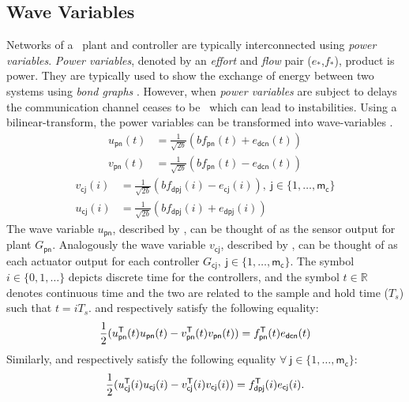 \subsection{Wave Variables}
\label{S:wave_variables}
 Networks of a \passive\ plant and controller are typically
  interconnected using {\it power variables}.  {\it Power variables}, 
  denoted by an {\it effort} and {\it flow} pair ($e_*$,$f_*$),
  product is power.  They are typically used to show the 
  exchange of energy between two systems using {\it bond graphs}
  \cite{breedveld06:_port_based_model_dynam_system, golo03:_hamil}.
  However, when {\it power variables} are subject to delays the
  communication channel ceases to be \passive\ which can lead to
  instabilities.  Using a bilinear-transform, the power variables can
  be transformed into wave-variables
  \cite{anderson92:_asymp_stabil_for_force_reflec,
    niemeyer04:_telem}.
\begin{align}
  \label{E:wave_transform_master_u}
  u_{\mathsf{pn}}(t) &= \frac{1}{\sqrt{2b}}(b f_{\mathsf{pn}}(t) + e_{\mathsf{dcn}}(t))\\
  \label{E:wave_transform_master_v}
  v_{\mathsf{pn}}(t) &= \frac{1}{\sqrt{2b}}(b f_{\mathsf{pn}}(t) - e_{\mathsf{dcn}}(t)) 
\end{align}
\begin{align}
  \label{E:wave_transform_slave_v}
  v_{\mathsf{cj}}(i) &= \frac{1}{\sqrt{2b}}(b f_{\mathsf{dpj}}(i) - e_{\mathsf{cj}}(i)),\ \mathsf{j} \in
  \{1, \dots, \mathsf{m_c}\}\\
  \label{E:wave_transform_slave_u}
  u_{\mathsf{cj}}(i) &= \frac{1}{\sqrt{2b}}(b f_{\mathsf{dpj}}(i) + e_{\mathsf{dpj}}(i))
\end{align}
  The wave variable $u_{\mathsf{pn}}$, described by , can
  be thought of as the sensor output for plant $G_{\mathsf{pn}}$.
  Analogously the wave variable $v_{\mathsf{cj}}$, described by
  , can be thought of as each actuator
  output for each controller $G_{\mathsf{cj}},\ \mathsf{j} \in
  \{1,\dots,\mathsf{m_c}\}$.  The symbol $i \in \{0,1,\dots\}$ depicts
  discrete time for the controllers, and the symbol $t \in \mathbb{R}$
  denotes continuous time and the two are related to the sample and
  hold time ($T_s$) such that $t=iT_s$.   and  respectively satisfy the following equality:
\begin{equation}
\label{E:wave_transform_master_uv}
\frac{1}{2}(u_{\mathsf{pn}}^{\mathsf{T}} (t)u_{\mathsf{pn}}(t) - v_{\mathsf{pn}}^{\mathsf{T}} (t) v_{\mathsf{pn}}(t)) = f_{\mathsf{pn}}^{\mathsf{T}} (t) e_{\mathsf{dcn}}(t)
\end{equation}
Similarly,  and  respectively satisfy the following equality $\forall\ \mathsf{j} \in \{1,\dots,\mathsf{m_c}\}$:
\begin{equation}
\label{E:wave_transform_slave_uv}
\frac{1}{2}(u_{\mathsf{cj}}^{\mathsf{T}} (i)u_{\mathsf{cj}}(i) - v_{\mathsf{cj}}^{\mathsf{T}} (i) v_{\mathsf{cj}}(i)) = f_{\mathsf{dpj}}^{\mathsf{T}} (i) e_{\mathsf{cj}}(i).
\end{equation}

